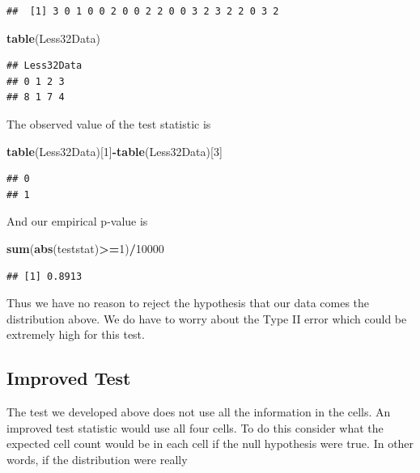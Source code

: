 \documentclass[]{book}
\newenvironment{Shaded}{\begin{snugshade}}{\end{snugshade}}
\newcommand{\KeywordTok}[1]{\textcolor[rgb]{0.13,0.29,0.53}{\textbf{#1}}}
\newcommand{\DecValTok}[1]{\textcolor[rgb]{0.00,0.00,0.81}{#1}}
\newcommand{\OperatorTok}[1]{\textcolor[rgb]{0.81,0.36,0.00}{\textbf{#1}}}
\newcommand{\NormalTok}[1]{#1}
\theoremstyle{definition}
\theoremstyle{definition}
\theoremstyle{definition}
\theoremstyle{remark}
\begin{document}
\begin{verbatim}
##  [1] 3 0 1 0 0 2 0 0 2 2 0 0 3 2 3 2 2 0 3 2
\end{verbatim}

\begin{Shaded}
\begin{Highlighting}[]
\KeywordTok{table}\NormalTok{(Less32Data)}
\end{Highlighting}
\end{Shaded}

\begin{verbatim}
## Less32Data
## 0 1 2 3 
## 8 1 7 4
\end{verbatim}

The observed value of the test statistic is

\begin{Shaded}
\begin{Highlighting}[]
\KeywordTok{table}\NormalTok{(Less32Data)[}\DecValTok{1}\NormalTok{]}\OperatorTok{-}\KeywordTok{table}\NormalTok{(Less32Data)[}\DecValTok{3}\NormalTok{]}
\end{Highlighting}
\end{Shaded}

\begin{verbatim}
## 0 
## 1
\end{verbatim}

And our empirical p-value is

\begin{Shaded}
\begin{Highlighting}[]
\KeywordTok{sum}\NormalTok{(}\KeywordTok{abs}\NormalTok{(teststat)}\OperatorTok{>=}\DecValTok{1}\NormalTok{)}\OperatorTok{/}\DecValTok{10000}
\end{Highlighting}
\end{Shaded}

\begin{verbatim}
## [1] 0.8913
\end{verbatim}

Thus we have no reason to reject the hypothesis that our data comes the
distribution above. We do have to worry about the Type II error which
could be extremely high for this test.

\subsection{Improved Test}\label{improved-test}

The test we developed above does not use all the information in the
cells. An improved test statistic would use all four cells. To do this
consider what the expected cell count would be in each cell if the null
hypothesis were true. In other words, if the distribution were really
\end{document}
